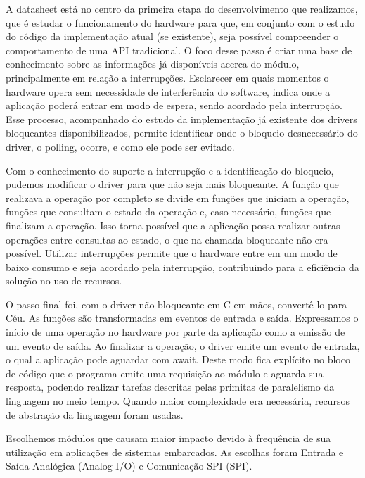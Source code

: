 \documentclass[11pt]{article}
\begin{document}
\par A datasheet está no centro da primeira etapa do desenvolvimento que realizamos, que é estudar o funcionamento do hardware para que, em conjunto com o estudo do código da implementação atual (se existente), seja possível compreender o comportamento de uma API tradicional. O foco desse passo é criar uma base de conhecimento sobre as informações já disponíveis acerca do módulo, principalmente em relação a interrupções. Esclarecer em quais momentos o hardware opera sem necessidade de interferência do software, indica onde a aplicação poderá entrar em modo de espera, sendo acordado pela interrupção. Esse processo, acompanhado do estudo da implementação já existente dos drivers bloqueantes disponibilizados, permite identificar onde o bloqueio desnecessário do driver, o polling, ocorre, e como ele pode ser evitado.
\par Com o conhecimento do suporte a interrupção e a identificação do bloqueio, pudemos modificar o driver para que não seja mais bloqueante. A função que realizava a operação por completo se divide em funções que iniciam a operação, funções que consultam o estado da operação e, caso necessário, funções que finalizam a operação. Isso torna possível que a aplicação possa realizar outras operações entre consultas ao estado, o que na chamada bloqueante não era possível. Utilizar interrupções permite que o hardware entre em um modo de baixo consumo e seja acordado pela interrupção, contribuindo para a eficiência da solução no uso de recursos.
\par O passo final foi, com o driver não bloqueante em C em mãos, convertê-lo para Céu. As funções são transformadas em eventos de entrada e saída. Expressamos o início de uma operação no hardware por parte da aplicação como a emissão de um evento de saída. Ao finalizar a operação, o driver emite um evento de entrada, o qual a aplicação pode aguardar com await. Deste modo fica explícito no bloco de código que o programa emite uma requisição ao módulo e aguarda sua resposta, podendo realizar tarefas descritas pelas primitas de paralelismo da linguagem no meio tempo. Quando maior complexidade era necessária, recursos de abstração da linguagem foram usadas.
\par Escolhemos módulos que causam maior impacto devido à frequência de sua utilização em aplicações de sistemas embarcados. As escolhas foram Entrada e Saída Analógica (Analog I/O) e Comunicação SPI (SPI).
\end{document}
